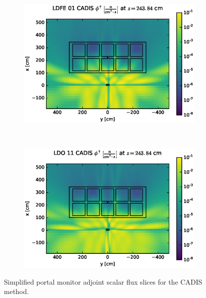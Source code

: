 \begin{figure}[!htb]
\ContinuedFloat
\begin{subfigure}{\textwidth}
\centering
\includegraphics[max height=0.445\textheight]
{img/cargo-plots/cad-adj/flux-ldfe01-slice.eps}
\end{subfigure}
\\
\begin{subfigure}{\textwidth}
\centering
\includegraphics[max height=0.445\textheight]
{img/cargo-plots/cad-adj/flux-ldo11-slice.eps}
\end{subfigure}
\caption{Simplified portal monitor adjoint scalar flux slices for the CADIS method.}
\label{cargo-cad-adj-slices}
\end{figure}

